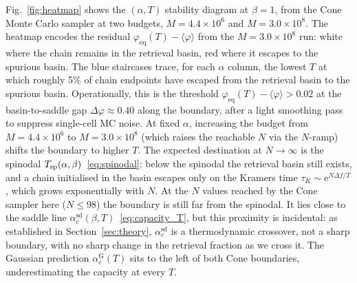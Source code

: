 \documentclass[letterpaper]{article} %
\newcommand{\e}{{\mathrm{e}}}
\newcommand{\Bnet}{\beta}
\newcommand{\acGauss}{\alpha_c^{\mathrm{G}}}
\newcommand{\acSd}{\alpha_c^{\mathrm{sd}}}
\begin{document}
Fig.~\ref{fig:heatmap} shows the $(\alpha, T)$ stability diagram at
$\Bnet = 1$, from the Cone Monte Carlo sampler at two budgets,
$M = 4.4 \times 10^6$ and $M = 3.0 \times 10^8$. The heatmap encodes the
residual $\varphi_{\mathrm{eq}}(T) - \langle\varphi\rangle$ from the
$M = 3.0 \times 10^8$ run: white where the chain remains in the retrieval
basin, red where it escapes to the spurious basin. The blue staircases trace,
for each $\alpha$ column, the lowest $T$ at which roughly 5\% of chain
endpoints have escaped from the retrieval basin to the spurious basin.
Operationally, this is the threshold
$\varphi_{\mathrm{eq}}(T) - \langle\varphi\rangle > 0.02$ at the
basin-to-saddle gap $\Delta\varphi \approx 0.40$ along the boundary, after
a light smoothing pass to suppress single-cell MC noise. At fixed $\alpha$, 
increasing the budget from $M = 4.4 \times 10^6$ to
$M = 3.0 \times 10^8$ (which raises the reachable $N$ via the $N$-ramp)
shifts the boundary to higher $T$. The expected destination at
$N \to \infty$ is the spinodal $T_{\rm sp}(\alpha, \Bnet)$~\eqref{eq:spinodal}:
below the spinodal the retrieval basin still exists, and a chain initialised
in the basin escapes only on the Kramers time
$\tau_K \sim \e^{N \Delta f / T}$, which grows exponentially with $N$.  At
the $N$ values reached by the Cone sampler here ($N \le 98$) the boundary
is still far from the spinodal.  It lies close to the saddle
line $\acSd(\Bnet, T)$~\eqref{eq:capacity_T}, but this proximity is
incidental: as established in Section~\ref{sec:theory}, $\acSd$ is a
thermodynamic crossover, not a sharp boundary, with no sharp change
in the retrieval fraction as we cross it.  The Gaussian prediction
$\acGauss(T)$ sits to the left of both Cone boundaries, underestimating
the capacity at every $T$.
\end{document}
